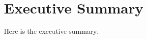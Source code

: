 
\section*{Executive Summary}\label{sec:executive summary}
Here is the executive summary.

\lipsum[1-3]

\newpage